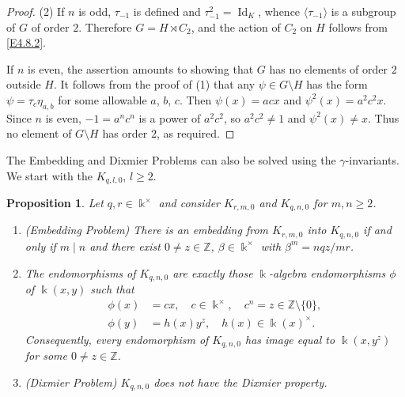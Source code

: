 \documentclass[12pt]{amsart}
\theoremstyle{plain}
\newtheorem{proposition}[theorem]{Proposition}
\numberwithin{theorem}{section}
\numberwithin{equation}{theorem}
\theoremstyle{definition}
\newcommand{\ZZ}{\mathbb{Z}}
\newcommand \kx {\Bbbk^\times}
\DeclareMathOperator{\Id}{Id}
\begin{document}
\begin{proof}
(2) If $n$ is odd, $\tau_{-1}$ is defined and $\tau_{-1}^2= \Id_K$, whence $\langle \tau_{-1}\rangle$
is a subgroup of $G$ of order $2$. Therefore $G = H \rtimes C_2$, and the action of $C_2$ on $H$ follows from \eqref{E4.8.2}. 

If $n$ is even, the assertion amounts to showing that $G$ has no elements of order $2$ outside $H$.  It follows from the proof of (1) that any $\psi \in G \setminus H$ has the form $\psi = \tau_c 
\eta_{a,b}$ for some allowable $a$, $b$, $c$.  Then $\psi(x) = acx$ and $\psi^2(x) = a^2c^2x$.  Since $n$ is even, $-1 = a^nc^n$ is a power of $a^2c^2$, so $a^2c^2 \ne 1$ and $\psi^2(x) \ne x$.  Thus no element of $G \setminus H$ has order $2$, as required.
\end{proof}


The Embedding and Dixmier Problems can also be solved using the 
$\gamma$-invariants.  We start with the $K_{q,l,0}$, $l \ge 2$.

\begin{proposition}
\label{zzpro4.9}
Let $q,r \in \kx$ and consider $K_{r,m,0}$ and $K_{q,n,0}$ for $m,n\geq 2$.
\begin{enumerate}
\item[(1)]{\rm{(Embedding Problem)}} 
There is an embedding from $K_{r,m,0}$ into $K_{q,n,0}$ if and only 
if $m\mid n$ and there exist $0 \ne z \in \ZZ$, $\beta \in \kx$ with $\beta^m = nqz/mr$.
\item[(2)]
The endomorphisms of $K_{q,n,0}$ are exactly those 
$\Bbbk$-algebra endomorphisms $\phi$ of $\Bbbk(x,y)$ such that
\begin{equation}  
\label{E4.9.1}\tag{E4.9.1}
\begin{aligned}
\phi(x)&=c x, \quad c \in \kx, \quad c^n=z\in \ZZ \setminus \{0\},\\
\phi(y)&=h(x) y^z, \quad h(x)\in \Bbbk(x)^{\times}.
\end{aligned}
\end{equation}
Consequently, every endomorphism of $K_{q,n,0}$ has image 
equal to $\Bbbk(x, y^{z})$ for some $0\neq z\in {\ZZ}$.
\item[(3)]{\rm{(Dixmier Problem)}}
$K_{q,n,0}$ does not have 
the Dixmier property.
\end{enumerate}
\end{proposition}
\end{document}
